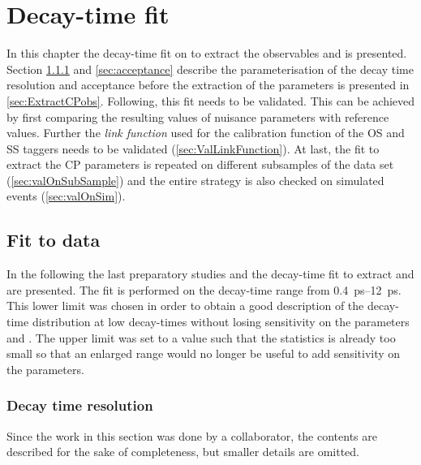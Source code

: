 \chapter{Decay-time fit}

In this chapter the decay-time fit on \BdToDpi to extract the \CP observables \Sf and \Sfbar is presented.
Section \ref{sec:resolution} and \ref{sec:acceptance} describe the parameterisation of the decay time resolution and acceptance before the extraction of the \CP parameters is presented in \cref{sec:ExtractCPobs}.
Following, this fit needs to be validated.
This can be achieved by first comparing the resulting values of nuisance parameters with reference values.
Further the \emph{link function} used for the calibration function of the OS and SS taggers needs to be validated (\cref{sec:ValLinkFunction}).
At last, the fit to extract the CP parameters is repeated on different subsamples of the data set (\cref{sec:valOnSubSample}) and the entire strategy is also checked on simulated events (\cref{sec:valOnSim}).

\section{Fit to data}

In the following the last preparatory studies and the decay-time fit to extract \Sf and \Sfbar are presented.
The fit is performed on the decay-time range from \SIrange{0.4}{12}{\pico\second}.
This lower limit was chosen in order to obtain a good description of the decay-time distribution at low decay-times without losing sensitivity on the parameters \Sf and \Sfbar.
The upper limit was set to a value such that the statistics is already too small so that an enlarged range would no longer be useful to add sensitivity on the \CP parameters.

\subsection{Decay time resolution}
\label{sec:resolution}

Since the work in this section was done by a collaborator, the contents are described for the sake of completeness, but smaller details are omitted.

